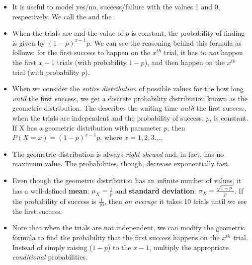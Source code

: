 \begin{itemize}
\item It is useful to model yes/no, success/failure with the values 1 and 0, respectively. We call the and the .

\item When the trials are  and the value of $p$ is constant, the probability of finding  is given by $(1-p)^{x-1}p$.  We can see the reasoning behind this formula as follows:  for the first success to happen on the $x^{th}$ trial, it has to \emph{not} happen the first $x-1$ trials (with probability $1-p$), and then happen on the $x^{th}$ trial (with probability $p$).  

\item When we consider the \emph{entire distribution} of possible values for the how long \emph{until} the first success, we get a discrete probability distribution known as the geometric distribution. The  describes the waiting time \emph{until} the first success, when the trials are independent and the probability of success, $p$, is constant.  If X has a geometric distribution with parameter $p$, then $P(X=x)=(1-p)^{x-1}p$, where $x=1,2,3\dots$.

\item The geometric distribution is always \emph{right skewed} and, in fact, has no maximum value.  The probabilities, though, decrease exponentially fast.

\item Even though the geometric distribution has an infinite number of values, it has a well-defined \textbf{mean}: $\mu_{\scriptscriptstyle{X}}=\frac{1}{p}$ and \textbf{standard deviation}: $\sigma_{\scriptscriptstyle{X}} = \frac{\sqrt{1-p \ }}{p}$.  If the probability of success is $\frac{1}{10}$, then \emph{on average} it takes 10 trials until we see the first success.

\item Note that when the trials are not independent, we can modify the geometric formula to find the probability that the first success happens on the $x^{th}$ trial. Instead of simply raising ($1-p$) to the $x-1$, multiply the appropriate \emph{conditional} probabilities.

\end{itemize}


{}



